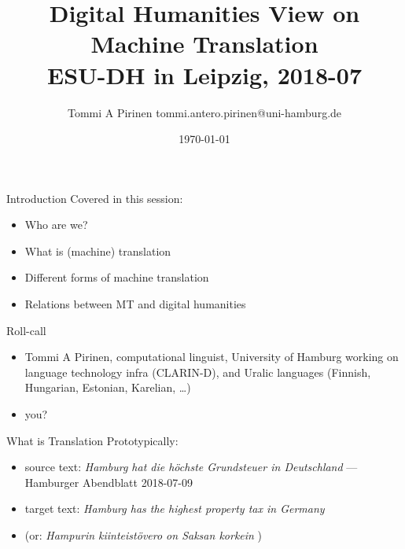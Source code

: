 \documentclass{beamer}
\title{Digital Humanities View on Machine Translation\\
\scriptsize{ESU-DH in Leipzig, 2018-07}}
\author{Tommi A Pirinen \scriptsize \guilsinglleft
tommi.antero.pirinen@uni-hamburg.de
\guilsinglright}
\institute{Hamburger Zentrum für Sprachkorpora, CLARIN-D}
\date{\today}
\begin{document}

\maketitle

\begin{frame}{Introduction}
    Covered in this session:
    \begin{itemize}
        \item Who are we?
        \item What is (machine) translation
        \item Different forms of machine translation
        \item Relations between MT and digital humanities
    \end{itemize}
\end{frame}

\begin{frame}{Roll-call}
    \begin{itemize}
        \item Tommi A Pirinen, computational linguist, University of Hamburg
            working on language technology infra (CLARIN-D), and Uralic
            languages (Finnish, Hungarian, Estonian, Karelian, \ldots)
        \item you?
    \end{itemize}
\end{frame}

\begin{frame}{What is Translation}
    Prototypically:
    \begin{itemize}
        \item source text: 
            \textit{Hamburg hat die
            höchste Grundsteuer in
            Deutschland} ---Hamburger Abendblatt 2018-07-09
        \item target text: 
            \textit{Hamburg has the
            highest property 
            tax in Germany}
        \item (or:
            \textit{Hampurin kiinteistövero
            on Saksan korkein
            })
    \end{itemize}
\end{frame}
\end{document}
